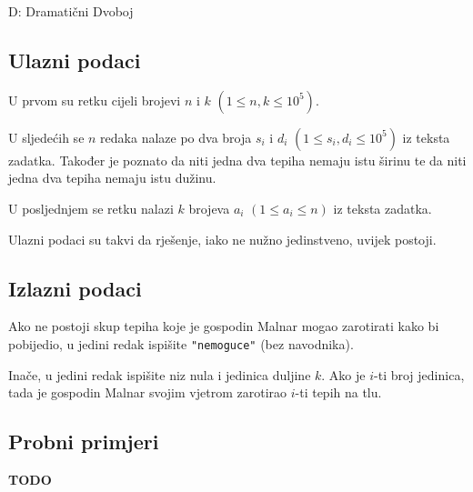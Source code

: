 \begin{statement}[
  timelimit=1 s,
  memorylimit=512 MiB,
]{D: Dramatični Dvoboj}
\subsection*{Ulazni podaci}
U prvom su retku cijeli brojevi $n$ i $k$ $(1 \le n, k \le 10^5)$.

U sljedećih se $n$ redaka nalaze po dva broja $s_i$ i $d_i$
$(1 \le s_i, d_i \le 10^5)$ iz teksta zadatka. Također je poznato
da niti jedna dva tepiha nemaju istu širinu te da niti jedna dva tepiha
nemaju istu dužinu.

U posljednjem se retku nalazi $k$ brojeva $a_i$ $(1 \le a_i \le n)$ iz
teksta zadatka.

Ulazni podaci su takvi da rješenje, iako ne nužno jedinstveno, uvijek
postoji.

\subsection*{Izlazni podaci}
Ako ne postoji skup tepiha koje je gospodin Malnar mogao zarotirati kako bi
pobijedio, u jedini redak ispišite \texttt{"nemoguce"} (bez navodnika).

Inače, u jedini redak ispišite niz nula i jedinica duljine $k$. Ako je $i$-ti broj
jedinica, tada je gospodin Malnar svojim vjetrom zarotirao $i$-ti tepih na
tlu.

\subsection*{Probni primjeri}

\textbf{TODO}

\end{statement}

